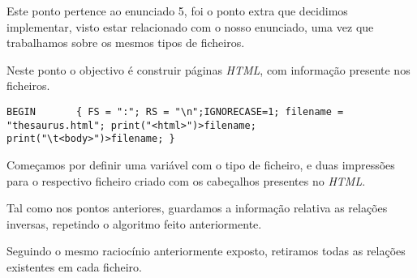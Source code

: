 \documentclass{report}
\begin{document}
    Este ponto pertence ao enunciado 5, foi o ponto extra que decidimos implementar, visto estar relacionado com o nosso enunciado, uma vez que trabalhamos sobre os mesmos tipos de ficheiros.

    Neste ponto o objectivo é construir páginas \textit{HTML}, com informação presente nos ficheiros.

\bigskip  

\begin{verbatim}
BEGIN       { FS = ":"; RS = "\n";IGNORECASE=1; filename = "thesaurus.html"; print("<html>")>filename; print("\t<body>")>filename; }
\end{verbatim}

    Começamos por definir uma variável com o tipo de ficheiro, e duas impressões para o respectivo ficheiro criado com os cabeçalhos presentes no \textit{HTML}.

    Tal como nos pontos anteriores, guardamos a informação relativa as relações inversas, repetindo o algoritmo feito anteriormente.

    Seguindo o mesmo raciocínio anteriormente exposto, retiramos todas as relações existentes em cada ficheiro.
\end{document}
